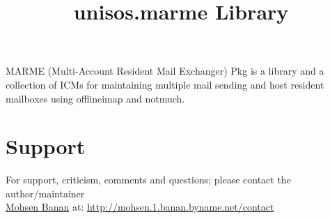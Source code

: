 \documentclass{article}
\begin{document}

\begin{comment}
*  [[elisp:(org-cycle)][| ]]  *DBLK: front-begin*                                       :: [[elisp:(beginning-of-buffer)][Top]] [[elisp:(delete-other-windows)][(1)]]  [[elisp:(org-cycle)][| ]]
\end{comment}


\begin{comment}
*  [[elisp:(org-cycle)][| ]]  *DBLK: copyright*                                       :: [[elisp:(beginning-of-buffer)][Top]] [[elisp:(delete-other-windows)][(1)]]  [[elisp:(org-cycle)][| ]]
\end{comment}


\begin{comment}
*  [[elisp:(org-cycle)][| ]]  *DBLK: front-end*                                       :: [[elisp:(beginning-of-buffer)][Top]] [[elisp:(delete-other-windows)][(1)]]  [[elisp:(org-cycle)][| ]]
\end{comment}


\begin{comment}
*  [[elisp:(org-cycle)][| ]]  *DBLK: main-begin*                                       :: [[elisp:(beginning-of-buffer)][Top]] [[elisp:(delete-other-windows)][(1)]]  [[elisp:(org-cycle)][| ]]
\end{comment}

\title{unisos.marme Library}


\thispagestyle{empty}


\bigskip

MARME (Multi-Account Resident Mail Exchanger) Pkg is a library
and a collection of ICMs for maintaining multiple mail sending
and host resident mailboxes using offlineimap and notmuch.

\section{Support}

For support, criticism, comments and questions; please contact the 
author/maintainer \\
\href{http://mohsen.1.banan.byname.net}{Mohsen Banan} at: \url{http://mohsen.1.banan.byname.net/contact}
\end{document}
